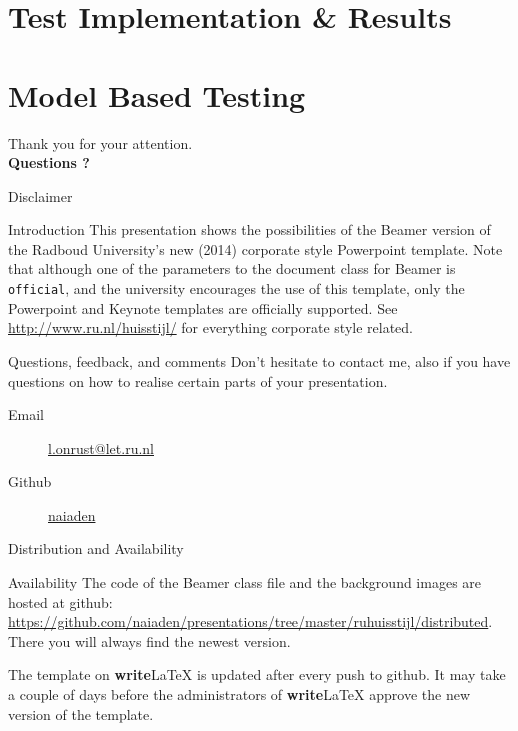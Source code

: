 \documentclass[showdate=true, slidenumbers=slide]{beamerruhuisstijl169}
\begin{document}
\section{Test Implementation \& Results}

\section{Model Based Testing}

\begin{frame}
\vfill
\centering
{\LARGE Thank you for your attention.}\\
\vspace{1cm}
{\Large \textbf{Questions ?}}
\vfill
\end{frame}

\appendix
\begin{frame}{Disclaimer}
    \begin{block}{Introduction}
        This presentation shows the possibilities of the Beamer version of the Radboud University's new (2014) corporate style Powerpoint template. Note that although one of the parameters to the document class for Beamer is \texttt{official}, and the university encourages the use of this template, only the Powerpoint and Keynote templates are officially supported. See \url{http://www.ru.nl/huisstijl/} for everything corporate style related.
    \end{block}

    \begin{block}{Questions, feedback, and comments}
        Don't hesitate to contact me, also if you have questions on how to realise certain parts of your presentation.
        \begin{description}
            \item[Email] \href{mailto:l.onrust@let.ru.nl}{l.onrust@let.ru.nl}
            \item[Github] \href{https://github.com/naiaden}{naiaden}
        \end{description}
    \end{block}
\end{frame}

\begin{frame}{Distribution and Availability}
    \begin{block}{Availability}
        The code of the Beamer class file and the background images are hosted at github: \url{https://github.com/naiaden/presentations/tree/master/ruhuisstijl/distributed}. There you will always find the newest version.

        The template on \textbf{write}\LaTeX{} is updated after every push to github. It may take a couple of days before the administrators of \textbf{write}\LaTeX{} approve the new version of the template.
    \end{block}

\end{frame}
\end{document}
